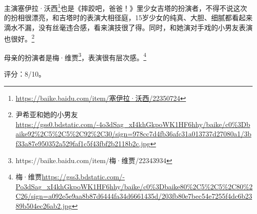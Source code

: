 主演塞伊拉·沃西\footnote{\url{https://baike.baidu.com/item/塞伊拉·沃西/22350724}}也是《摔跤吧，爸爸！》里少女吉塔的扮演者，不得不说这次的扮相很漂亮，和吉塔时的表演大相径庭，15岁少女的纯真、大胆、细腻都看起来滴水不漏，没有丝毫违合感，看来演技很了得。同时，和她演对手戏的小男友表演也很好。\footnote{尹希亚和她的小男友\url{https://gss0.bdstatic.com/-4o3dSag_xI4khGkpoWK1HF6hhy/baike/c0\%3Dbaike92\%2C5\%2C5\%2C92\%2C30/sign=978cc7d4fb36afc31a013737d27080a1/3bf33a87e950352a529faf1c5f43fbf2b2118b2c.jpg}}

母亲的扮演者是梅·维贾\footnote{https://baike.baidu.com/item/梅·维贾/22343934}，表演很有层次感。\footnote{
梅·维贾\url{https://gss3.bdstatic.com/-Po3dSag_xI4khGkpoWK1HF6hhy/baike/c0\%3Dbaike80\%2C5\%2C5\%2C80\%2C26/sign=a092e5e9aa8b87d6444fa34d6661435d/203fb80e7bec54e7255f4dc6b2389b504ec26ab2.jpg}}

评分：8/10。